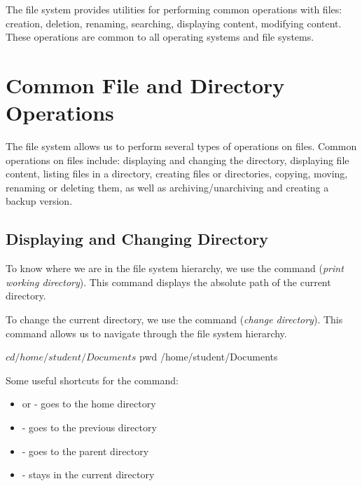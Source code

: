 \label{ch:file-mgmt}

The file system provides utilities for performing common operations with files: creation, deletion, renaming, searching, displaying content, modifying content.
These operations are common to all operating systems and file systems.

\section{Common File and Directory Operations}
\label{sec:file-mgmt:file-ops}

The file system allows us to perform several types of operations on files.
Common operations on files include: displaying and changing the directory, displaying file content, listing files in a directory, creating files or directories, copying, moving, renaming or deleting them, as well as archiving/unarchiving and creating a backup version.

\subsection{Displaying and Changing Directory}
\label{sec:file-mgmt:dir-ops}

To know where we are in the file system hierarchy, we use the  command (\textit{print working directory}).
This command displays the absolute path of the current directory.


To change the current directory, we use the  command (\textit{change directory}).
This command allows us to navigate through the file system hierarchy.

\begin{screen}[style=bashstyle]
$ cd /home/student/Documents
$ pwd
/home/student/Documents
\end{screen}

Some useful shortcuts for the  command:
\begin{itemize}
  \item {} or  - goes to the home directory
  \item {} - goes to the previous directory
  \item {} - goes to the parent directory
  \item {} - stays in the current directory
\end{itemize}

